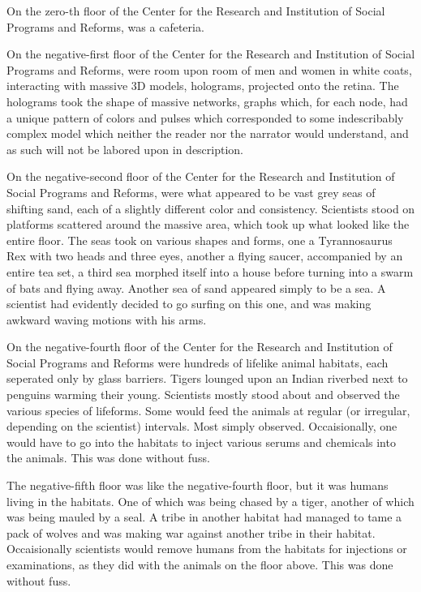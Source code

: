 \documentclass[12pt]{article}
\begin{document}
On the zero-th floor of the Center for the Research and Institution of Social Programs and Reforms, was a cafeteria.

On the negative-first floor of the  Center for the Research and Institution of Social Programs and Reforms, were room upon room of men and women in white coats, interacting with massive 3D models, holograms, projected onto the retina. The holograms took the shape of massive networks, graphs which, for each node, had a unique pattern of colors and pulses which corresponded to some indescribably complex model which neither the reader nor the narrator would understand, and as such will not be labored upon in description.

On the negative-second floor of the Center for the Research and Institution of Social Programs and Reforms, were what appeared to be vast grey seas of shifting sand, each of a slightly different color and consistency. Scientists stood on platforms scattered around the massive area, which took up what looked like the entire floor. The seas took on various shapes and forms, one a Tyrannosaurus Rex with two heads and three eyes, another a flying saucer, accompanied by an entire tea set, a third sea morphed itself into a house before turning into a swarm of bats and flying away. Another sea of sand appeared simply to be a sea. A scientist had evidently decided to go surfing on this one, and was making awkward waving motions with his arms.

On the negative-fourth floor of the Center for the Research and Institution of Social Programs and Reforms were hundreds of lifelike animal habitats, each seperated only by glass barriers. Tigers lounged upon an Indian riverbed next to penguins warming their young. Scientists mostly stood about and observed the various species of lifeforms. Some would feed the animals at regular (or irregular, depending on the scientist) intervals. Most simply observed. Occaisionally, one would have to go into the habitats to inject various serums and chemicals into the animals. This was done without fuss.

The negative-fifth floor was like the negative-fourth floor, but it was humans living in the habitats. One of which was being chased by a tiger, another of which was being mauled by a seal. A tribe in another habitat had managed to tame a pack of wolves and was making war against another tribe in their habitat. Occaisionally scientists would remove humans from the habitats for injections or examinations, as they did with the animals on the floor above. This was done without fuss.
\end{document}
